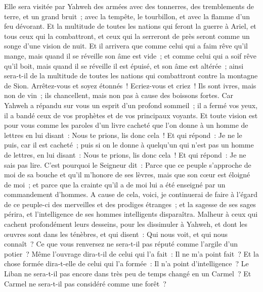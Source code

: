 \begin{multicols}{2}
Elle sera visitée par Yahweh des armées avec des tonnerres, des tremblements de terre, et un grand bruit~; avec la tempête, le tourbillon, et avec la flamme d'un feu dévorant.
Et la multitude de toutes les nations qui feront la guerre à Ariel, et tous ceux qui la combattront, et ceux qui la serreront de près seront comme un songe d'une vision de nuit.
Et il arrivera que comme celui qui a faim rêve qu'il mange, mais quand il se réveille son âme est vide~; et comme celui qui a soif rêve qu'il boit, mais quand il se réveille il est épuisé, et son âme est altérée~; ainsi sera-t-il de la multitude de toutes les nations qui combattront contre la montagne de Sion.
Arrêtez-vous et soyez étonnés~! Ecriez-vous et criez~! Ils sont ivres, mais non de vin~; ils chancellent, mais non pas à cause des boissons fortes.
Car Yahweh a répandu sur vous un esprit d'un profond sommeil~; il a fermé vos yeux, il a bandé ceux de vos prophètes et de vos principaux voyants.
Et toute vision est pour vous comme les paroles d'un livre cacheté que l'on donne à un homme de lettres en lui disant~: Nous te prions, lis donc cela~! Et qui répond~: Je ne le puis, car il est cacheté~;
puis si on le donne à quelqu'un qui n'est pas un homme de lettres, en lui disant~: Nous te prions, lis donc cela~! Et qui répond~: Je ne sais pas lire.
C'est pourquoi le Seigneur dit~: Parce que ce peuple s'approche de moi de sa bouche et qu'il m'honore de ses lèvres, mais que son cœur est éloigné de moi~; et parce que la crainte qu'il a de moi lui a été enseigné par un commandement d'hommes.
A cause de cela, voici, je continuerai de faire à l'égard de ce peuple-ci des merveilles et des prodiges étranges~; et la sagesse de ses sages périra, et l'intelligence de ses hommes intelligents disparaîtra.
Malheur à ceux qui cachent profondément leurs desseins, pour les dissimuler à Yahweh, et dont les œuvres sont dans les ténèbres, et qui disent~: Qui nous voit, et qui nous connaît~?
Ce que vous renversez ne sera-t-il pas réputé comme l'argile d'un potier~? Même l'ouvrage dira-t-il de celui qui l'a fait~: Il ne m'a point fait~? Et la chose formée dira-t-elle de celui qui l'a formée~: Il n'a point d'intelligence~?
Le Liban ne sera-t-il pas encore dans très peu de temps changé en un Carmel~? Et Carmel ne sera-t-il pas considéré comme une forêt~?

\end{multicols}
